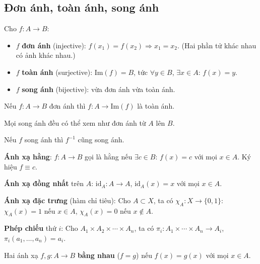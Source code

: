 \documentclass[12pt,a4paper]{article}
\begin{document}
\subsection{Đơn ánh, toàn ánh, song ánh}

\begin{dinhnghia}
  Cho $f: A \to B$:
  \begin{itemize}
    \item $f$ \textbf{đơn ánh} (injective): $f(x_1) = f(x_2) \Rightarrow x_1 = x_2$. (Hai phần tử khác nhau có ảnh khác nhau.)
    \item $f$ \textbf{toàn ánh} (surjective): $\mathrm{Im}(f) = B$, tức $\forall y \in B$, $\exists x \in A$: $f(x) = y$.
    \item $f$ \textbf{song ánh} (bijective): vừa đơn ánh vừa toàn ánh.
  \end{itemize}
\end{dinhnghia}

\begin{tinhchat}
  Nếu $f: A \to B$ đơn ánh thì $f: A \to \mathrm{Im}(f)$ là toàn ánh. 
  
  Mọi song ánh đều có thể xem như đơn ánh từ $A$ lên $B$.

  Nếu $f$ song ánh thì $f^{-1}$ cũng song ánh.
\end{tinhchat}

\begin{dinhnghia}
  \textbf{Ánh xạ hằng}: $f: A \to B$ gọi là hằng nếu $\exists c \in B$: $f(x) = c$ với mọi $x \in A$. Ký hiệu $f \equiv c$.
\end{dinhnghia}

\begin{dinhnghia}
  \textbf{Ánh xạ đồng nhất} trên $A$: $\mathrm{id}_A: A \to A$, $\mathrm{id}_A(x) = x$ với mọi $x \in A$.
\end{dinhnghia}

\begin{dinhnghia}
  \textbf{Ánh xạ đặc trưng} (hàm chỉ tiêu): Cho $A \subset X$, ta có $\chi_A: X \to \{0, 1\}$: $\chi_A(x) = 1$ nếu $x \in A$, $\chi_A(x) = 0$ nếu $x \notin A$.
\end{dinhnghia}

\begin{dinhnghia}
  \textbf{Phép chiếu} thứ $i$: Cho $A_1 \times A_2 \times \cdots \times A_n$, ta có $\pi_i: A_1 \times \cdots \times A_n \to A_i$, $\pi_i(a_1, \ldots, a_n) = a_i$.
\end{dinhnghia}

\begin{dinhnghia}
  Hai ánh xạ $f, g: A \to B$ \textbf{bằng nhau} ($f = g$) nếu $f(x) = g(x)$ với mọi $x \in A$.
\end{dinhnghia}
\end{document}
